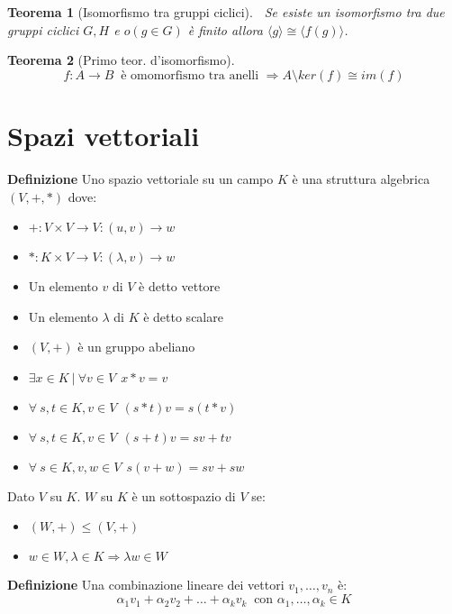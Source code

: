 \documentclass{article}
\newtheorem{theorem}{Teorema}
\begin{document}
\begin{theorem}[Isomorfismo tra gruppi ciclici]$\ $\newline
    Se esiste un isomorfismo tra due gruppi ciclici $G,H$ e $o(g\in G)$ è finito allora $\langle g\rangle\cong \langle f(g)\rangle$.\newline
\end{theorem}

\begin{theorem}[Primo teor. d'isomorfismo]
    $$f:A\rightarrow B\ \text{ è omomorfismo tra anelli } \Rightarrow A\setminus ker(f)\cong im(f)$$
\end{theorem}

\newpage

\section{Spazi vettoriali}

\textbf{Definizione} Uno spazio vettoriale su un campo $K$ è una struttura algebrica $(V,+,*)$ dove:
\begin{itemize}
    \item $+:V\times V\rightarrow V:(u,v)\rightarrow w$
    \item $*:K\times V\rightarrow V:(\lambda,v)\rightarrow w$
    \item Un elemento $v$ di $V$ è detto vettore
    \item Un elemento $\lambda$ di $K$ è detto scalare
    \item $(V,+)$ è un gruppo abeliano
    \item $\exists x\in K\ |\ \forall v\in V\ \  x*v=v$
    \item $\forall\ s,t\in K,v\in V\ \ (s*t)v=s(t*v)$
    \item $\forall\ s,t\in K,v\in V\ \ (s+t)v=sv+tv$
    \item $\forall\ s\in K,v,w\in V\ \ s(v+w)=sv+sw$\newline
\end{itemize}

\noindent Dato $V$ su $K$. $W$ su $K$ è un sottospazio di $V$ se:
\begin{itemize}
    \item $(W,+)\leqslant(V,+)$
    \item $w\in W,\lambda\in K\Rightarrow\lambda w\in W$\newline
\end{itemize}

\noindent\textbf{Definizione} Una combinazione lineare dei vettori $v_1,\ldots,v_n$ è:
$$\alpha_1v_1+\alpha_2v_2+\ldots+\alpha_kv_k\ \text{ con } \alpha_1,\ldots,\alpha_k\in K$$\newline
\end{document}
